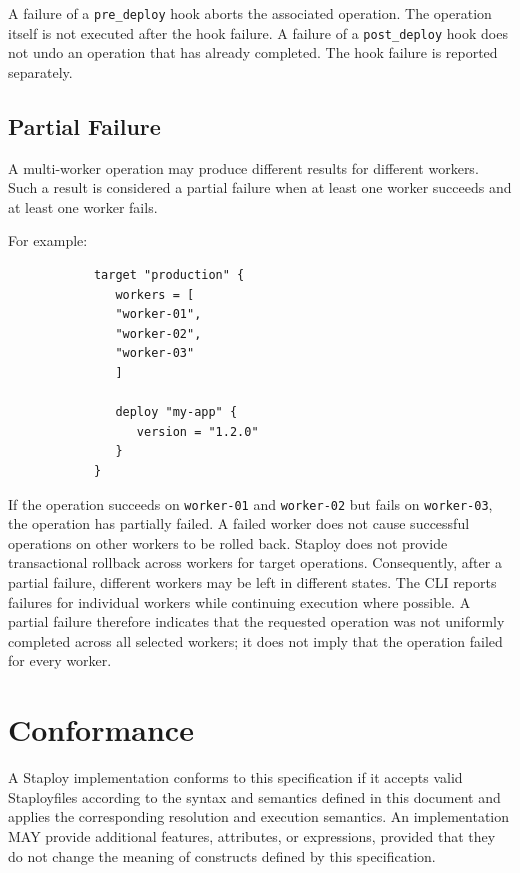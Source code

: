 \documentclass[11pt,a4paper]{article}
\begin{document}
    A failure of a \texttt{pre\_deploy} hook aborts the associated operation.
    The operation itself is not executed after the hook failure.
    A failure of a \texttt{post\_deploy} hook does not undo an operation that has already completed.
    The hook failure is reported separately.

    \subsection{Partial Failure}\label{subsec:partial-failure}

    A multi-worker operation may produce different results for different workers.
    Such a result is considered a partial failure when at least one worker succeeds and at least one worker fails.

    For example:

    \begin{center}
        \begin{verbatim}
            target "production" {
               workers = [
               "worker-01",
               "worker-02",
               "worker-03"
               ]

               deploy "my-app" {
                  version = "1.2.0"
               }
            }
        \end{verbatim}
    \end{center}

    If the operation succeeds on \texttt{worker-01} and \texttt{worker-02} but fails on \texttt{worker-03}, the operation has partially failed.
    A failed worker does not cause successful operations on other workers to be rolled back.
    Staploy does not provide transactional rollback across workers for target operations.
    Consequently, after a partial failure, different workers may be left in different states.
    The CLI reports failures for individual workers while continuing execution where possible.
    A partial failure therefore indicates that the requested operation was not uniformly completed across all selected workers; it does not imply that the operation failed for every worker.


    \section{Conformance}\label{sec:conformance}

    A Staploy implementation conforms to this specification if it accepts valid Staployfiles according to the syntax and semantics defined in this document and applies the corresponding resolution and execution semantics.
    An implementation MAY provide additional features, attributes, or expressions, provided that they do not change the meaning of constructs defined by this specification.
\end{document}
